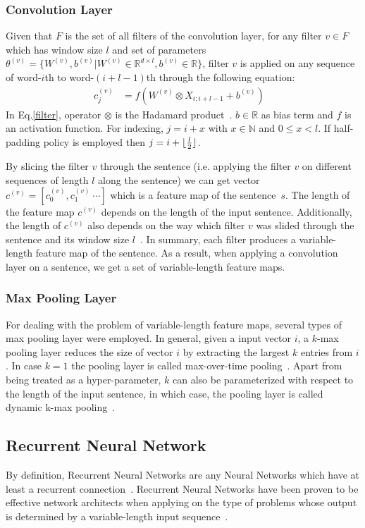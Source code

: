 \subsubsection{Convolution Layer}\label{conv-layer}
Given that \(F\) is the set of all filters of the convolution layer, for any filter \(v \in F\) which has window size \(l\) and set of parameters \(\theta^{(v)} = \{ W^{(v)}, b^{(v)} | W^{(v)} \in \mathbb{R}^{d \times l}, b^{(v)} \in \mathbb{R}\}\), filter \({v}\) is applied on any sequence of word-\(i\)th to word-\((i+l-1)\)th through the following equation:
\begin{align}
c^{(v)}_j &= f(W^{(v)} \otimes X_{i:i+l-1} + b^{(v)}) &\label{filter}
\end{align}
In Eq.\eqref{filter}, operator \(\otimes\) is the Hadamard product~\cite{element-prod}.
\(b \in \mathbb{R}\) as bias term and \(f\) is an activation function.
For indexing, \(j = i + x\) with \(x \in \mathbb{N}\) and \(0 \leq x < l\).
If half-padding policy is employed then \(j = i + \lfloor \frac{l}{2} \rfloor\).

By slicing the filter \(v\) through the sentence (i.e. applying the filter \(v\) on different sequences of length \(l\) along the sentence) we can get vector \(c^{(v)} = [c^{(v)}_0, c^{(v)}_1~\cdots]\) which is a feature map of the sentence~\(s\).
The length of the feature map \(c^{(v)}\) depends on the length of the input sentence.
Additionally, the length of \(c^{(v)}\) also depends on the way which filter \(v\) was slided through the sentence and its window size \(l\)~\cite{conv-arith}.
In summary, each filter produces a variable-length feature map of the sentence.
As a result, when applying a convolution layer on a sentence, we get a set of variable-length feature maps.
\subsubsection{Max Pooling Layer}
For dealing with the problem of variable-length feature maps, several types of max pooling layer were employed.
In general, given a input vector \(i\), a \(k\)-max pooling layer reduces the size of vector \(i\) by extracting the largest \(k\) entries from \(i\).
In case \(k = 1\) the pooling layer is called max-over-time pooling~\cite{nlp-scratch,KimCNN}.
Apart from being treated as a hyper-parameter, \(k\) can also be parameterized with respect to the length of the input sentence, in which case, the pooling layer is called dynamic k-max pooling~\cite{DCNN}.
\subsection{Recurrent Neural Network}
By definition, Recurrent Neural Networks are any Neural Networks which have at least a recurrent connection~\cite{rnn-def}.
Recurrent Neural Networks have been proven to be effective network architects when applying on the type of problems whose output is determined by a variable-length input sequence~\cite{speech-lstm,SutskeverVL14,mikolov-nlm}.
